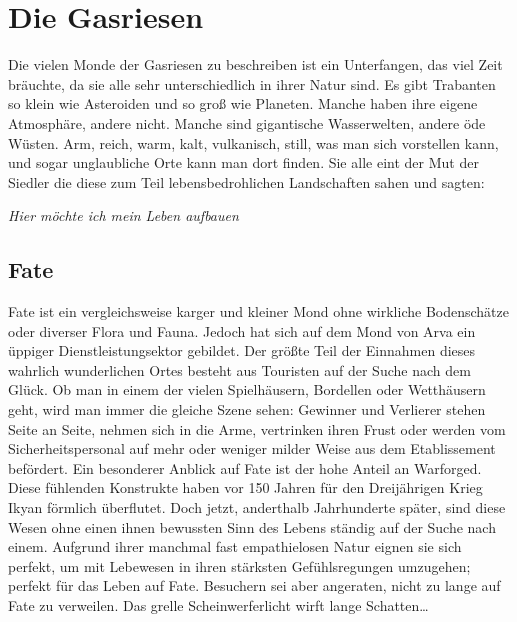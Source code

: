 \documentclass{book}
\begin{document}

\section{Die Gasriesen}
    Die vielen Monde der Gasriesen zu beschreiben ist ein Unterfangen, das viel Zeit bräuchte, da sie alle sehr unterschiedlich in ihrer Natur sind. Es gibt Trabanten so klein wie Asteroiden und so groß wie Planeten. Manche haben ihre eigene Atmosphäre, andere nicht. Manche sind gigantische Wasserwelten, andere öde Wüsten. Arm, reich, warm, kalt, vulkanisch, still, was man sich vorstellen kann, und sogar unglaubliche Orte kann man dort finden. Sie alle eint der Mut der Siedler die diese zum Teil lebensbedrohlichen Landschaften sahen und sagten:
\begin{flushright}{\it Hier möchte ich mein Leben aufbauen}\end{flushright}

    \subsection{Fate}
        Fate ist ein vergleichsweise karger und kleiner Mond ohne wirkliche Bodenschätze oder diverser Flora und Fauna. Jedoch hat sich auf dem Mond von Arva ein üppiger Dienstleistungsektor gebildet. Der größte Teil der Einnahmen dieses wahrlich wunderlichen Ortes besteht aus Touristen auf der Suche nach dem Glück. Ob man in einem der vielen Spielhäusern, Bordellen oder Wetthäusern geht, wird man immer die gleiche Szene sehen: Gewinner und Verlierer stehen Seite an Seite, nehmen sich in die Arme, vertrinken ihren Frust oder werden vom Sicherheitspersonal auf mehr oder weniger milder Weise aus dem Etablissement befördert. Ein besonderer Anblick auf Fate ist der hohe Anteil an Warforged. Diese fühlenden Konstrukte haben vor 150 Jahren für den Dreijährigen Krieg Ikyan förmlich überflutet. Doch jetzt, anderthalb Jahrhunderte später, sind diese Wesen ohne einen ihnen bewussten Sinn des Lebens ständig auf der Suche nach einem. Aufgrund ihrer manchmal fast empathielosen Natur eignen sie sich perfekt, um mit Lebewesen in ihren stärksten Gefühlsregungen umzugehen; perfekt für das Leben auf Fate. Besuchern sei aber angeraten, nicht zu lange auf Fate zu verweilen. Das grelle Scheinwerferlicht wirft lange Schatten\dots\\
\end{document}

